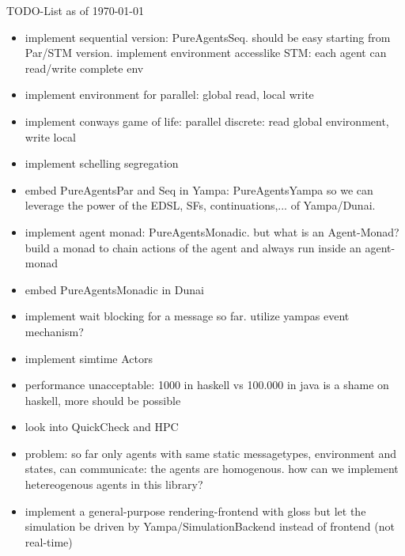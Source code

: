 TODO-List as of \today

\begin{itemize}
\item implement sequential version: PureAgentsSeq. should be easy starting from Par/STM version. implement environment accesslike STM: each agent can read/write complete env

\item implement environment for parallel: global read, local write
\item implement conways game of life: parallel discrete: read global environment, write local
\item implement schelling segregation

\item embed PureAgentsPar and Seq in Yampa: PureAgentsYampa so we can leverage the power of the EDSL, SFs, continuations,... of Yampa/Dunai.
\item implement agent monad: PureAgentsMonadic. but what is an Agent-Monad? build a monad to chain actions of the agent and always run inside an agent-monad
\item embed PureAgentsMonadic in Dunai

\item implement wait blocking for a message so far. utilize yampas event mechanism?

\item implement simtime Actors

\item performance unacceptable: 1000 in haskell vs 100.000 in java is a shame on haskell, more should be possible
\item look into QuickCheck and HPC
\item problem: so far only agents with same static messagetypes, environment and states, can communicate: the agents are homogenous. how can we implement hetereogenous agents in this library?
\item implement a general-purpose rendering-frontend with gloss but let the simulation be driven by Yampa/SimulationBackend instead of frontend (not real-time)



\end{itemize}
